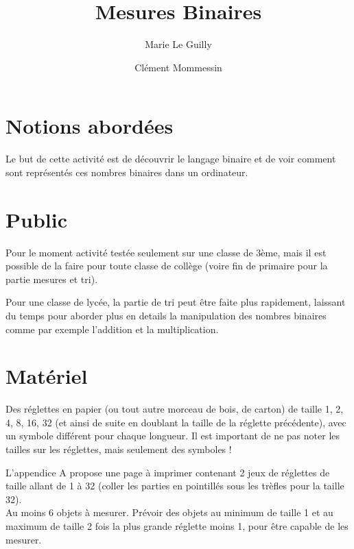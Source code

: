 \documentclass[a4paper,12pt]{scrartcl}
\begin{document}
\title{Mesures Binaires}
\author{Marie Le Guilly \and Clément Mommessin}

\maketitle

\section{Notions abordées}

Le but de cette activité est de découvrir le langage binaire et de voir comment sont représentés ces nombres binaires dans un ordinateur.


\section{Public}

Pour le moment activité testée seulement sur une classe de 3ème, mais il est possible de la faire pour toute classe de collège (voire fin de primaire pour la partie mesures et tri).

Pour une classe de lycée, la partie de tri peut être faite plus rapidement, laissant du temps pour aborder plus en details la manipulation des nombres binaires comme par exemple l'addition et la multiplication.



\section{Matériel}

Des réglettes en papier (ou tout autre morceau de bois, de carton) de taille 1, 2, 4, 8, 16, 32 (et ainsi de suite en doublant la taille de la réglette précédente), avec un symbole différent pour chaque longueur. Il est important de ne pas noter les tailles sur les réglettes, mais seulement des symboles !

L'appendice A propose une page à imprimer contenant 2 jeux de réglettes de taille allant de 1 à 32 (coller les parties en pointillés sous les trèfles pour la taille 32).\\


Au moins 6 objets à mesurer. Prévoir des objets au minimum de taille 1 et au maximum de taille 2 fois la plus grande réglette moins 1, pour être capable de les mesurer.
\end{document}
